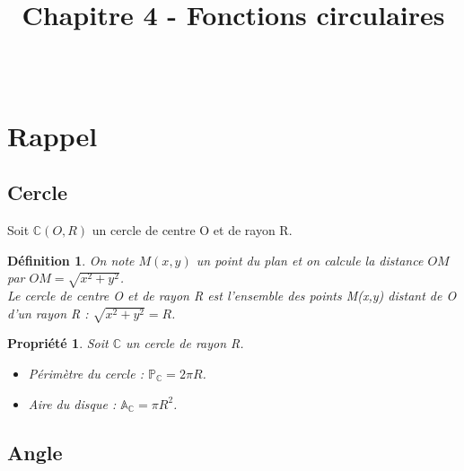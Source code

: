 \documentclass[paper=a4, fontsize=11pt]{scrartcl} %
\title{	
  \vspace{-10ex}
  \horrule{0.5pt} \\[0.4cm] %
  \huge Chapitre 4 - Fonctions circulaires\\ %
  \horrule{2pt} \\[0.5cm] %
}
\author{}
\date{\vspace{-10ex}} %
\begin{document}

\newtheorem{Definition}{Définition}
\newtheorem{Theorem}{Théorème}
\newtheorem{Proposition}{Propriété}

\renewcommand{\labelitemi}{$\bullet$}
\renewcommand{\labelitemii}{$\circ$}

\maketitle %
\setlength{\columnseprule}{1pt}

\section{Rappel}

\subsection{Cercle}

Soit $\mathbb{C}(O,R)$ un cercle de centre O et de rayon R.


\begin{Definition}
  On note $M(x,y)$ un point du plan et on calcule la distance $OM$ par $OM = \sqrt{x^2 + y^2}$. \\
  Le cercle de centre O et de rayon R est l'ensemble des points M(x,y) distant de O d'un rayon R : $\sqrt{x^2 + y^2} = R$.
\end{Definition}

\begin{Proposition} Soit $\mathbb{C}$ un cercle de rayon R.
  \begin{itemize}
  \item Périmètre du cercle : $\mathbb{P}_{\mathbb{C}} = 2 \pi R$. 
  \item Aire du disque : $\mathbb{A}_{\mathbb{C}} = \pi R ^2$.
  \end{itemize} 
\end{Proposition}

\subsection{Angle}
\end{document}
